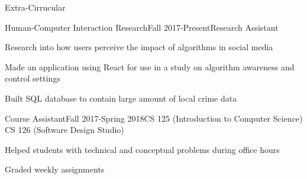 \documentclass{resume} %
\begin{document}
    \begin{rSection}{Extra-Cirrucular} \itemsep -3pt
            \begin{rSubsection}{Human-Computer Interaction Research}{Fall 2017-Present}{Research Assistant}{}{}
            \item Research into how users perceive the impact of algorithms in social media
            \item Made an application using React for use in a study on algorithm awareness and control settings
            \item Built SQL database to contain large amount of local crime data
            \end{rSubsection}

            \begin{rSubsection}{Course Assistant}{Fall 2017-Spring 2018}{CS 125 (Introduction to Computer Science) \\ CS 126 (Software Design Studio)}{}{}
            \item Helped students with technical and conceptual problems during office hours
            \item Graded weekly assignments
            \end{rSubsection}

    \end{rSection}

    
\end{document}
